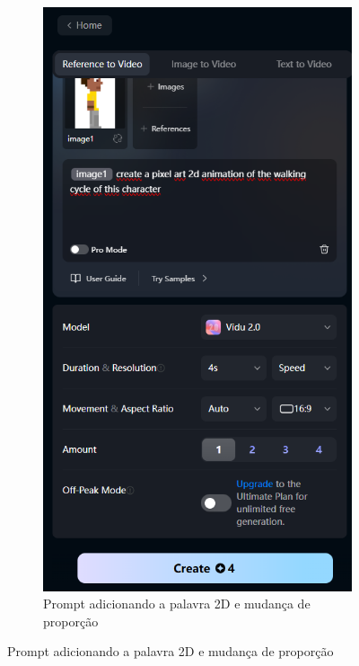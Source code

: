 \begin{figure}[htbp]
    \centering
    \caption{\small Processo da utilização 2 do Vidu em julho/2025}
    \label{fig:vidu3}
    \begin{subfigure}{0.4\linewidth}
        \includegraphics[width=1\linewidth]{figs/vidu/tela4.PNG}
        \caption{\small Prompt adicionando a palavra 2D e mudança de proporção}

\end{subfigure}
\end{figure}
